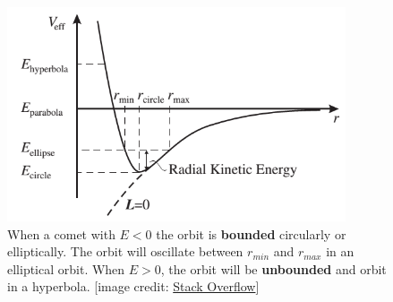 \begin{figure}
    \centering
    \includegraphics[width=10cm]{Classical_Mechanics/2.15-two-central-forces/Ueff.png}
    \caption{When a comet with $E < 0$ the orbit is {\bfseries bounded} circularly or elliptically. The orbit will oscillate between $r_{min}$ and $r_{max}$ in an elliptical orbit. When $E > 0$, the orbit will be {\bfseries unbounded} and orbit in a hyperbola. [image credit: \href{https://physics.stackexchange.com/questions/379708/doubts-about-the-effective-potential-in-newtonian-gravity}{Stack Overflow}]}
    \label{fig:Ueff}
\end{figure}

